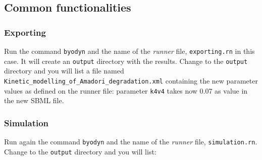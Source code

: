 \documentclass[a4paper, 11pt]{article}
\begin{document}
  \subsection{Common functionalities} \label{functionalities}
  \subsubsection{Exporting}
  Run the command \texttt{byodyn} and the name of the \emph{runner} file, \texttt{exporting.rn} in this case. 
  It will create an \texttt{output} directory with the results. 
  Change to the \texttt{output} directory and you will list a file named \texttt{Kinetic\_modelling\_of\_Amadori\_degradation.xml} containing the new parameter values as defined on the runner file: parameter \texttt{k4v4} takes now 0.07 as value in the new SBML file.
  \subsubsection{Simulation}\label{simulation}
  Run again the command \texttt{byodyn} and the name of the \emph{runner} file, \texttt{simulation.rn}. 
  Change to the \texttt{output} directory and you will list:
\end{document}
